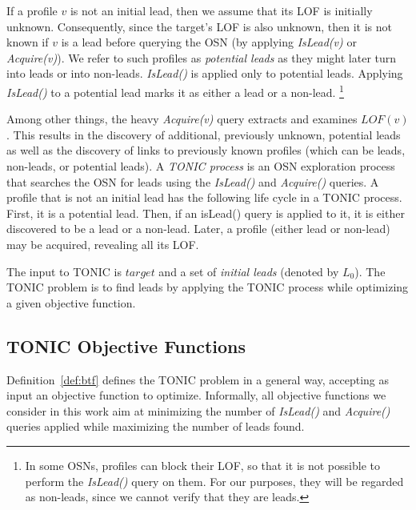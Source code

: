 \documentclass[journal]{IEEEtran}
\newcommand{\islead}[1]{{\em IsLead(#1)}}
\newcommand{\acquire}[1]{{\em Acquire(#1)}}
\begin{document}
If a profile $v$ is not an initial lead, then we assume that its LOF is initially unknown.
Consequently, since the target's LOF is also unknown, then it is not known if $v$ is a lead before querying the OSN  (by applying \islead{v} or \acquire{v}). We refer to such profiles as {\em potential leads} as they might later turn into leads or into non-leads. \islead{} is applied only to potential leads.  Applying \islead{} to a potential lead marks it as either a lead or a non-lead. %
\footnote{In some OSNs, profiles can block their LOF, so that it is not possible to perform the \islead{} query on them. For our purposes, they will be regarded as non-leads, since we cannot verify that they are leads.} 





%

Among other things, the heavy \acquire{v} query extracts and examines $LOF(v)$. This results in the discovery of additional, previously unknown, potential leads as well as the discovery of links to previously known profiles (which can be leads, non-leads, or potential leads). A {\em TONIC process} is an OSN exploration process that searches the OSN for leads using the \islead{} and \acquire{} queries.
A profile that is not an initial lead has the following life cycle in a TONIC process. First, it is a potential lead. Then, if an isLead() query is applied to it, it is either discovered to be a lead or a non-lead. Later, a profile (either lead or non-lead) may be acquired, revealing all its LOF. 



  

\begin{definition}

The input to TONIC is $target$ and a set of {\em initial leads} (denoted by \(L_0\)). The TONIC problem is to find leads by applying the TONIC process while optimizing a given objective function. 
\label{def:btf}
\end{definition}

\subsection{TONIC Objective Functions}
Definition~\ref{def:btf} defines the TONIC problem in a general way, accepting as input an objective function to optimize. Informally, all objective functions we consider in this work aim at minimizing the number of \islead{} and \acquire{} queries applied while maximizing the number of leads found. 
\end{document}
